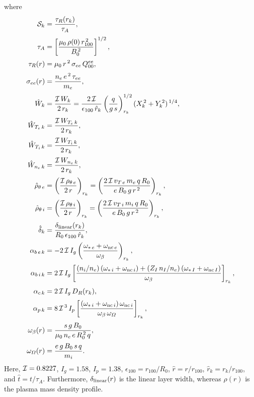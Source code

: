 \documentclass[notitlepage,12pt]{article}
\begin{document}
where
\begin{align}\label{e23}
{\cal S}_k&=\frac{\tau_R(r_k)}{\tau_A},\\[0.5ex]
\tau_A &= \left[\frac{\mu_0\,\rho(0)\,r_{100}^{\,2}}{B_0^{\,2}}\right]^{1/2},\\[0.5ex]
\tau_R(r) &= \mu_0\,r^{\,2}\,\sigma_{ee}\,Q_{00}^{ee},\\[0.5ex]
\sigma_{ee}(r) &=\frac{n_e\,e^{\,2}\,\tau_{ee}}{m_e},\\[0.5ex]
\hat{W}_k &=\frac{{\cal I}\,W_k}{2\,r_k}=\frac{2\,{\cal I}}{\epsilon_{100}\,\hat{r}_k}\left(\frac{q}{g\,s}\right)^{1/2}_{r_k} (X_k^{\,2} + Y_k^{\,2})^{\,1/4},\\[0.5ex]
\hat{W}_{T_e\,k} &=\frac{{\cal I}\,W_{T_e\,k}}{2\,r_k} ,\\[0.5ex]
\hat{W}_{T_i\,k} &= \frac{{\cal I}\,W_{T_i\,k}}{2\,r_k},\\[0.5ex]
\hat{W}_{n_e\,k} &= \frac{{\cal I}\,W_{n_e\,k}}{2\,r_k},\\[0.5ex]
\hat{\rho}_{\theta\,e} &=  \left(\frac{{\cal I}\,\rho_{\theta\,e}}{2\,r}\right)_{r_k}=\left(\frac{2\,{\cal I}\,v_{T\,e}\,m_e\,q\,R_0}{e\,B_0\,g\,r^{\,2}}\right)_{r_k},\\[0.5ex]
\hat{\rho}_{\theta\,i} &=  \left(\frac{{\cal I}\,\rho_{\theta\,i}}{2\,r}\right)_{r_k}= \left(\frac{2\,{\cal I}\,v_{T\,i}\,m_i\,q\,R_0}{e\,B_0\,g\,r^{\,2}}\right)_{r_k},\\[0.5ex]
\hat{\delta}_k &= \frac{\delta_{\rm linear}(r_k)}{R_0\,\epsilon_{100}\,\hat{r}_k},\\[0.5ex]
\alpha_{b\,e\,k} &= -2\,{\cal I}\,I_g\left(\frac{\omega_{\ast\,e}+\omega_{{\rm nc}\,e}}{\omega_\beta}\right)_{r_k},\\[0.5ex]
\alpha_{b\,i\,k} &= 2\,{\cal I}\,I_g\left[\frac{(n_i/n_e)\left(\omega_{\ast\,i}+\omega_{{\rm nc}\,i}\right)+(Z_I\,n_I/n_e)\left(\omega_{\ast\,I}+\omega_{{\rm nc}\,I}\right)}{\omega_\beta}\right]_{r_k},\\[0.5ex]
\alpha_{c\,k} &= 2\,{\cal I}\,I_g\,D_R(r_k),\\[0.5ex]
\alpha_{p\,k} &= 8\,{\cal I}^{\,3}\, I_p\left[\frac{(\omega_{\ast\,i}+\omega_{{\rm nc}\,i})\,\omega_{{\rm nc}\,i}}{\omega_\beta\,\omega_{\mit\Omega}}\right]_{r_k},\\[0.5ex]
\omega_{\beta}(r)&= \frac{s\,g\,B_0}{\mu_0\,n_e\,e\,R_0^{\,2}\,q},\\[0.5ex]
\omega_{\mit\Omega}(r)&= \frac{e\,g\,B_0\,s\,q}{m_i}.
\end{align}
Here, ${\cal I}=0.8227$, $I_g=1.58$, $I_p=1.38$, $\epsilon_{100}=r_{100}/R_0$, $\hat{r}=r/r_{100}$, $\hat{r}_k=r_k/r_{100}$, and $\hat{t}=t/\tau_A$. Furthermore, $\delta_{\rm linear}(r)$ is the linear layer width, whereas $\rho(r)$ is the plasma
mass density profile. 
\end{document}
